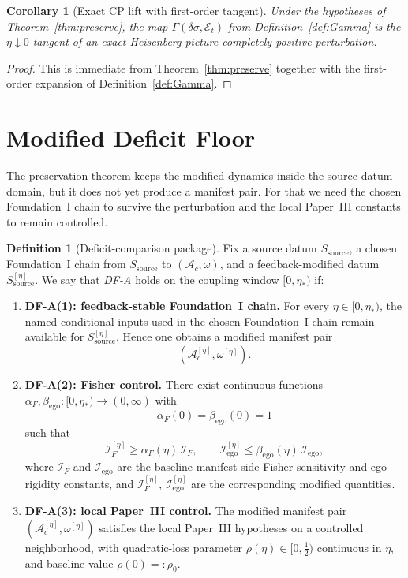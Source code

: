 \documentclass[12pt]{article}
\newtheorem{corollary}[theorem]{Corollary}
\theoremstyle{definition}
\newtheorem{definition}[theorem]{Definition}
\theoremstyle{remark}
\begin{document}
\begin{corollary}[Exact CP lift with first-order tangent]
\label{cor:firstorder}
Under the hypotheses of Theorem~\ref{thm:preserve}, the map
\(\Gamma(\delta\sigma,\mathcal E_t)\) from
Definition~\ref{def:Gamma} is the \(\eta\downarrow 0\) tangent of an
exact Heisenberg-picture completely positive perturbation.
\end{corollary}

\begin{proof}
This is immediate from Theorem~\ref{thm:preserve} together with the
first-order expansion of Definition~\ref{def:Gamma}.
\end{proof}

\section{Modified Deficit Floor}\label{sec:deficit}

The preservation theorem keeps the modified dynamics inside the
source-datum domain, but it does not yet produce a manifest pair. For
that we need the chosen Foundation~I chain to survive the perturbation
and the local Paper~III constants to remain controlled.

\begin{definition}[Deficit-comparison package]\label{def:DFA}
Fix a source datum \(S_{\mathrm{source}}\), a chosen Foundation~I chain
from \(S_{\mathrm{source}}\) to \((\mathcal A_c,\omega)\), and a
feedback-modified datum \(S_{\mathrm{source}}^{[\eta]}\). We say that
\emph{DF-A} holds on the coupling window \([0,\eta_*)\) if:
\begin{enumerate}
\item \textbf{DF-A(1): feedback-stable Foundation~I chain.}
  For every \(\eta\in[0,\eta_*)\), the named conditional inputs used in
  the chosen Foundation~I chain remain available for
  \(S_{\mathrm{source}}^{[\eta]}\). Hence one obtains a modified manifest
  pair
  \[
  (\mathcal A_c^{[\eta]},\omega^{[\eta]}).
  \]
\item \textbf{DF-A(2): Fisher control.}
  There exist continuous functions
  \(\alpha_F,\beta_{\mathrm{ego}}:[0,\eta_*)\to(0,\infty)\) with
  \[
  \alpha_F(0)=\beta_{\mathrm{ego}}(0)=1
  \]
  such that
  \[
  \mathcal I_F^{[\eta]}
  \ge
  \alpha_F(\eta)\,\mathcal I_F,
  \qquad
  \mathcal I_{\mathrm{ego}}^{[\eta]}
  \le
  \beta_{\mathrm{ego}}(\eta)\,\mathcal I_{\mathrm{ego}},
  \]
  where \(\mathcal I_F\) and
  \(\mathcal I_{\mathrm{ego}}\) are the baseline manifest-side Fisher
  sensitivity and ego-rigidity constants, and
  \(\mathcal I_F^{[\eta]}\),
  \(\mathcal I_{\mathrm{ego}}^{[\eta]}\) are the corresponding modified
  quantities.
\item \textbf{DF-A(3): local Paper~III control.}
  The modified manifest pair
  \((\mathcal A_c^{[\eta]},\omega^{[\eta]})\) satisfies the local
  Paper~III hypotheses on a controlled neighborhood, with quadratic-loss
  parameter \(\rho(\eta)\in[0,\tfrac12)\) continuous in \(\eta\), and
  baseline value \(\rho(0)=:\rho_0\).
\end{enumerate}
\end{definition}
\end{document}
